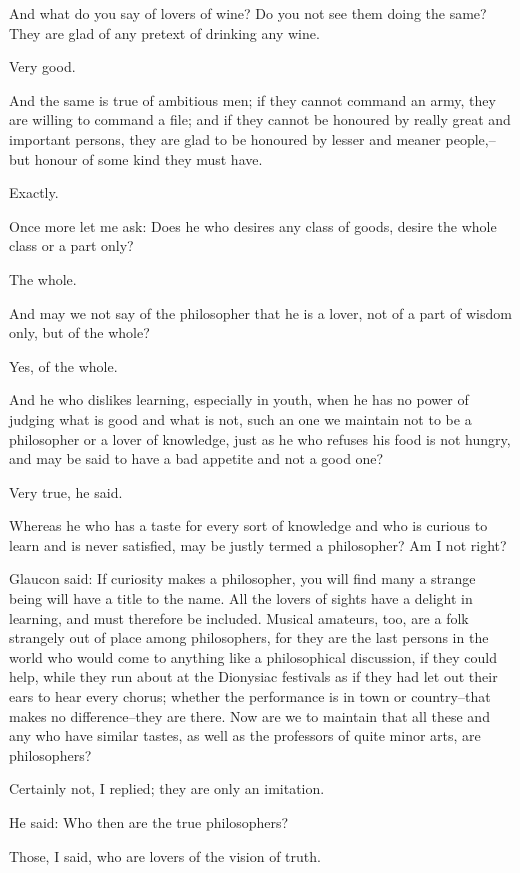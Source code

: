 And what do you say of lovers of wine? Do you not see them doing the
same? They are glad of any pretext of drinking any wine.

Very good.

And the same is true of ambitious men; if they cannot command an army,
they are willing to command a file; and if they cannot be honoured by
really great and important persons, they are glad to be honoured by
lesser and meaner people,--but honour of some kind they must have.

Exactly.

Once more let me ask: Does he who desires any class of goods, desire the
whole class or a part only?

The whole.

And may we not say of the philosopher that he is a lover, not of a part
of wisdom only, but of the whole?

Yes, of the whole.

And he who dislikes learning, especially in youth, when he has no power
of judging what is good and what is not, such an one we maintain not
to be a philosopher or a lover of knowledge, just as he who refuses his
food is not hungry, and may be said to have a bad appetite and not a
good one?

Very true, he said.

Whereas he who has a taste for every sort of knowledge and who is
curious to learn and is never satisfied, may be justly termed a
philosopher? Am I not right?

Glaucon said: If curiosity makes a philosopher, you will find many a
strange being will have a title to the name. All the lovers of sights
have a delight in learning, and must therefore be included. Musical
amateurs, too, are a folk strangely out of place among philosophers, for
they are the last persons in the world who would come to anything like
a philosophical discussion, if they could help, while they run about at
the Dionysiac festivals as if they had let out their ears to hear every
chorus; whether the performance is in town or country--that makes no
difference--they are there. Now are we to maintain that all these and
any who have similar tastes, as well as the professors of quite minor
arts, are philosophers?

Certainly not, I replied; they are only an imitation.

He said: Who then are the true philosophers?

Those, I said, who are lovers of the vision of truth.

